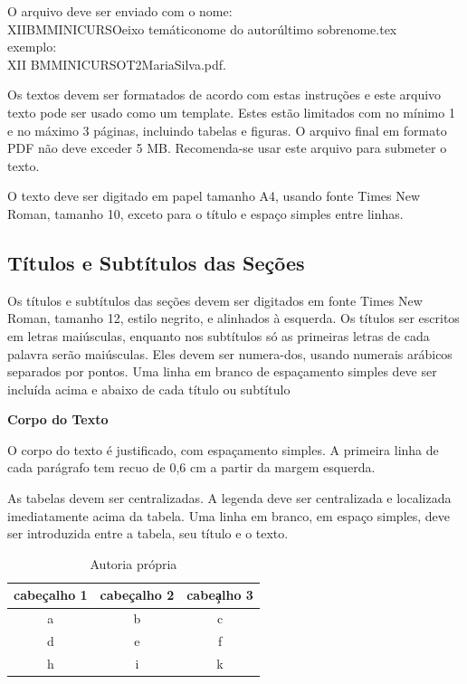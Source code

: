 \documentclass[12pt,oneside,a4paper]{article}
\begin{document}
O arquivo deve ser enviado com o nome: \vspace{0.3cm}\\ XII\textunderscore BM\textunderscore MINICURSO\textunderscore eixo temático\textunderscore nome do autor\textunderscore último sobrenome.tex\\ 
exemplo:\vspace{0.3cm}\\
XII \textunderscore BM\textunderscore  MINICURSO\textunderscore T2\textunderscore Maria\textunderscore Silva.pdf.

Os textos devem ser formatados de acordo com estas instruções e este arquivo texto pode ser usado como um template. Estes estão limitados com no mínimo 1 e  no máximo 3 páginas, incluindo tabelas e figuras. O arquivo final em formato PDF não deve exceder 5 MB. Recomenda-se usar este arquivo para submeter o texto.

O texto deve ser digitado em papel tamanho A4, usando fonte Times New Roman, tamanho 10, exceto para o título e espaço simples entre linhas.

\subsection{Títulos e Subtítulos das Seções}

Os títulos e subtítulos das seções devem ser digitados em fonte Times New Roman, tamanho 12, estilo negrito, e alinhados à esquerda. Os títulos ser escritos em letras maiúsculas, enquanto nos subtítulos só as primeiras letras de cada palavra serão maiúsculas. Eles devem ser numera-dos, usando numerais arábicos separados por pontos. Uma linha em branco de espaçamento simples deve ser incluída acima e abaixo de cada título ou subtítulo

\textbf{Corpo do Texto}

O corpo do texto é justificado, com espaçamento simples. A primeira linha de cada parágrafo tem recuo de 0,6 cm a partir da margem esquerda.

As tabelas devem ser centralizadas. A legenda deve ser centralizada e localizada imediatamente acima da tabela. Uma linha em branco, em espaço simples, deve ser introduzida entre a tabela, seu título e o texto.

\begin{table}
	\centering
\begin{tabular}{c|c|c}
cabe\c calho 1&cabe\c calho 2&cabe\c alho 3\\
\hline
a&b&c\\
d&e&f\\
h&i&k
\end{tabular}
\caption{Autoria pr\'opria}
\end{table}
\end{document}
